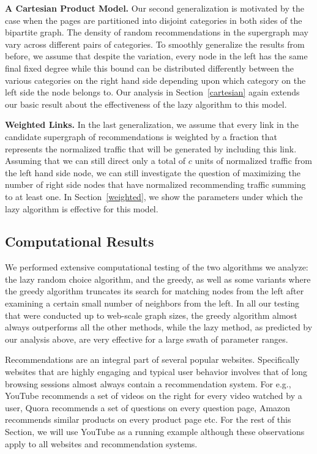 {\bf A Cartesian Product Model.}
Our second generalization is motivated by the case when the pages are
partitioned into disjoint categories in both sides of the bipartite graph. The
density of random recommendations in the supergraph may vary across different
pairs of categories. To smoothly generalize the results from before, we assume
that despite the variation, every node in the left has the same final fixed
degree while this bound can be distributed differently between the various
categories on the right hand side depending upon which category on the left side
the node belongs to.  Our analysis in Section~\ref{cartesian} again extends our
basic result about the effectiveness of the lazy algorithm to this model.\vs

{\bf Weighted Links.}
In the last generalization, we assume that every link in the candidate
supergraph of recommendations is weighted by a fraction that represents the
normalized traffic that will be generated by including this link. Assuming that
we can still direct only a total of $c$ units of normalized traffic from the
left hand side node, we can still investigate the question of maximizing the
number of right side nodes that have normalized recommending traffic summing to
at least one. In Section~\ref{weighted}, we show the parameters under which the
lazy algorithm is effective for this model. \vs

\subsection{Computational Results}
We performed extensive computational testing of the two algorithms we analyze:
the lazy random choice algorithm, and the greedy, as well as some variants where
the greedy algorithm truncates its search for matching nodes from the left after
examining a certain small number of neighbors from the left. In all our testing
that were conducted up to web-scale graph sizes, the greedy algorithm almost
always outperforms all the other methods, while the lazy method, as predicted by
our analysis above, are very effective for a large swath of parameter ranges. 


\iffalse

Recommendations are an integral part of several popular websites. Specifically
websites that are highly engaging and typical user behavior involves that
of long browsing sessions almost always contain a recommendation system. For
e.g., YouTube recommends a set of videos on the right for every video watched
by a user, Quora recommends a set of questions on every question page, Amazon
recommends similar products on every product page etc. For the rest of this
Section, we will use YouTube as a running example although these observations
apply to all websites and recommendation systems. \vs

